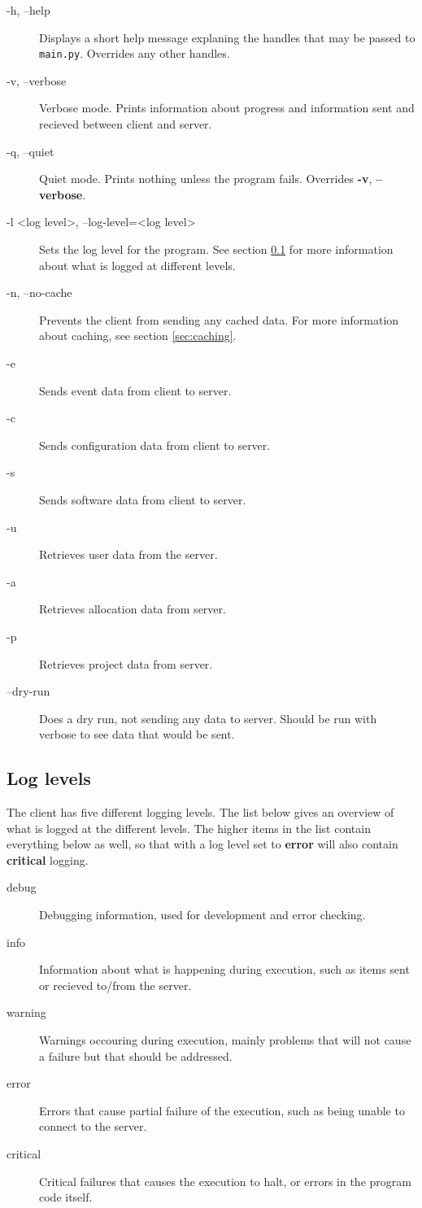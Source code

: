 \begin{description}
    \item[-h, --help]   Displays a short help message explaning the handles
    that may be passed to \texttt{main.py}. Overrides any other handles.
    \item[-v, --verbose]    Verbose mode. Prints information about progress and
    information sent and recieved between client and server. 
    \item[-q, --quiet]  Quiet mode. Prints nothing unless the program fails.
    Overrides \textbf{-v}, \textbf{--verbose}.
    \item[-l \textless log level\textgreater, --log-level=\textless log
    level\textgreater] Sets the log level for the program. See section 
    \ref{sec:loglevels} for more information about what is logged at different 
    levels.
    \item[-n, --no-cache]   Prevents the client from sending any cached data.
    For more information about caching, see section \ref{sec:caching}.
    \item[-e]   Sends event data from client to server.
    \item[-c]   Sends configuration data from client to server.
    \item[-s]   Sends software data from client to server.
    \item[-u]   Retrieves user data from the server.
    \item[-a]   Retrieves allocation data from server.
    \item[-p]   Retrieves project data from server.
    \item[--dry-run]    Does a dry run, not sending any data to server. Should
    be run with verbose to see data that would be sent.
\end{description}

\subsection{Log levels}
\label{sec:loglevels}
The client has five different logging levels. The list below gives an overview
of what is logged at the different levels. The higher items in the list contain
everything below as well, so that with a log level set to \textbf{error} will
also contain \textbf{critical} logging.

\begin{description}
    \item[debug]    Debugging information, used for development and error
    checking.
    \item[info] Information about what is happening during execution, such as
    items sent or recieved to/from the server.
    \item[warning]  Warnings occouring during execution, mainly problems that
    will not cause a failure but that should be addressed.
    \item[error]    Errors that cause partial failure of the execution, such as
    being unable to connect to the server.
    \item[critical] Critical failures that causes the execution to halt, or
    errors in the program code itself.
\end{description}

